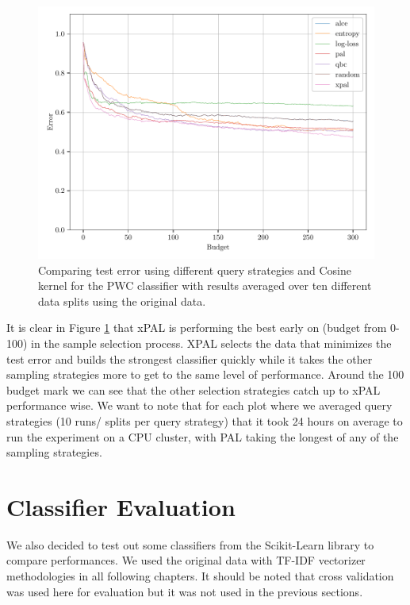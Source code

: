 \begin{figure}[ht]
    \centering
    \includegraphics[width=\textwidth]{../img/plot_text_data_original_proper_vectorizer_test_results}
    \caption{Comparing test error using different query strategies and Cosine kernel for the PWC classifier with results averaged over ten different data splits using the original data.}
    \label{fig:cos_avg_test_results}
\end{figure}

It is clear in Figure \ref{fig:cos_avg_test_results} that xPAL is performing the best early on (budget from 0-100) in the sample selection process. XPAL selects the data that minimizes the test error and builds the strongest classifier quickly while it takes the other sampling strategies more to get to the same level of performance. Around the 100 budget mark we can see that the other selection strategies catch up to xPAL performance wise. We want to note that for each plot where we averaged query strategies (10 runs/ splits per query strategy) that it took 24 hours on average to run the experiment on a CPU cluster, with PAL taking the longest of any of the sampling strategies.

\newpage

\section{Classifier Evaluation}
\label{sec:classifier_evaluation}

We also decided to test out some classifiers from the Scikit-Learn library to compare performances. We used the original data with TF-IDF vectorizer methodologies in all following chapters. It should be noted that cross validation was used here for evaluation but it was not used in the previous sections.

